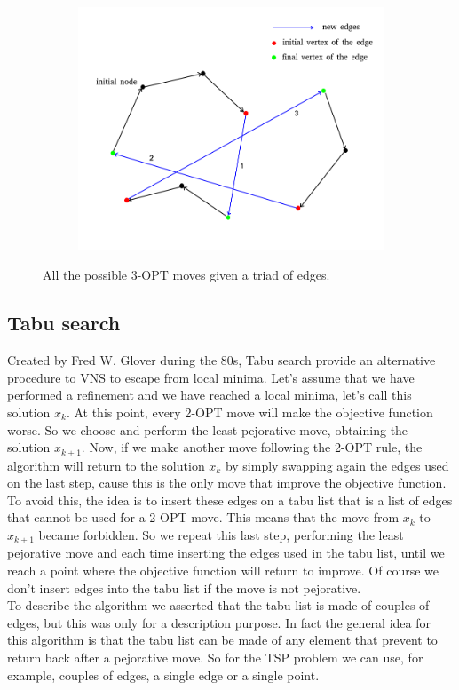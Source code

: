 \begin{figure}[h!]
\begin{subfigure}[b]{0.42\linewidth}
    \includegraphics[width=\linewidth]{media/vns3.png}
    \caption{}
  \end{subfigure}
  \caption{All the possible 3-OPT moves given a triad of edges.}
\end{figure}


\subsection{Tabu search}
Created by Fred W. Glover during the 80s, Tabu search provide an alternative procedure to VNS to escape from local minima. Let's assume that we have performed a refinement and we have reached a local minima, let's call this solution $x_k$. At this point, every 2-OPT move will make the objective function worse. So we choose and perform the least pejorative move, obtaining the solution $x_{k+1}$. Now, if we make another move following the 2-OPT rule, the algorithm will return to the solution $x_{k}$ by simply swapping again the edges used on the last step, cause this is the only move that improve the objective function. To avoid this, the idea is to insert these edges on a tabu list that is a list of edges that cannot be used for a 2-OPT move. This means that the move from $x_{k}$ to $x_{k+1}$ became forbidden. So we repeat this last step, performing the least pejorative move and each time inserting the edges used in the tabu list, until we reach a point where the objective function will return to improve. Of course we don't insert edges into the tabu list if the move is not pejorative. \\
To describe the algorithm we asserted that the tabu list is made of couples of edges, but this was only for a description purpose. In fact the general idea for this algorithm is that the tabu list can be made of any element that prevent to return back after a pejorative move. So for the TSP problem we can use, for example, couples of edges, a single edge or a single point. \\

